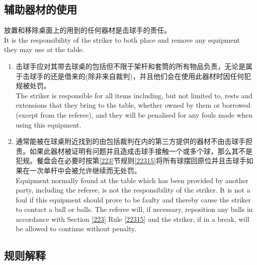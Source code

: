 \subsection{辅助器材的使用}\label{22320}

\noindent 放置和移除桌面上的用到的任何器材是击球手的责任。\\
It is the responsibility of the striker to both place and remove any 
equipment they may use at the table.
\begin{enumerate}[label=(\alph*)]
    \item 击球手应对其带去球桌的包括但不限于架杆和套筒的所有物品负责，无论是属于击球手的还是借来的(除非来自裁判)，并且他们会在使用此器材时因任何犯规被处罚。\\
    The striker is responsible for all items including, but not limited to, rests and extensions that they bring to the table, whether owned by them or borrowed (except from the referee), and they will be penalised for any fouls made when using this equipment.
    \item \label{22320b}通常能被在球桌附近找到的由包括裁判在内的第三方提供的器材不由击球手担责。如果此器材被证明有问题并且造成击球手接触一个或多个球，那么其不是犯规。餐盘会在必要时按第\ref{223}节规则\ref{22315}将所有球摆回原位并且击球手如果在一次单杆中会被允许继续而无处罚。\\
    Equipment normally found at the table which has been provided by another party, including the referee, is not the responsibility of the striker. It is not a foul if this equipment should prove to be faulty and thereby cause the striker to contact a ball or balls. The referee will, if necessary, reposition any balls in accordance with Section \ref{223} Rule \ref{22315} and the striker, if in a break, will be allowed to continue without penalty.
\end{enumerate}

\subsection{规则解释}

